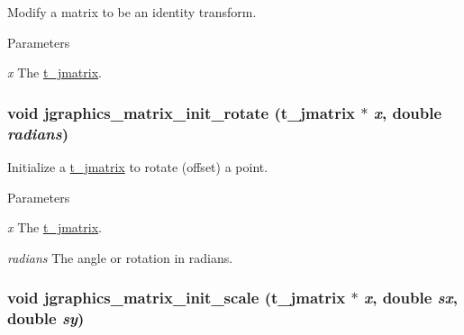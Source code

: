 Modify a matrix to be an identity transform. 
\begin{DoxyParams}{Parameters}
\item[{\em x}]The \hyperlink{structt__jmatrix}{t\_\-jmatrix}. \end{DoxyParams}
\hypertarget{group__jmatrix_gaa2e4de77693076fab80df039bb56990e}{
\subsubsection[{jgraphics\_\-matrix\_\-init\_\-rotate}]{\setlength{\rightskip}{0pt plus 5cm}void jgraphics\_\-matrix\_\-init\_\-rotate ({\bf t\_\-jmatrix} $\ast$ {\em x}, \/  double {\em radians})}}
\label{group__jmatrix_gaa2e4de77693076fab80df039bb56990e}


Initialize a \hyperlink{structt__jmatrix}{t\_\-jmatrix} to rotate (offset) a point. 
\begin{DoxyParams}{Parameters}
\item[{\em x}]The \hyperlink{structt__jmatrix}{t\_\-jmatrix}. \item[{\em radians}]The angle or rotation in radians. \end{DoxyParams}
\hypertarget{group__jmatrix_ga1f8e9b71bc22f3744643cc25d24f0ac4}{
\subsubsection[{jgraphics\_\-matrix\_\-init\_\-scale}]{\setlength{\rightskip}{0pt plus 5cm}void jgraphics\_\-matrix\_\-init\_\-scale ({\bf t\_\-jmatrix} $\ast$ {\em x}, \/  double {\em sx}, \/  double {\em sy})}}
\label{group__jmatrix_ga1f8e9b71bc22f3744643cc25d24f0ac4}


